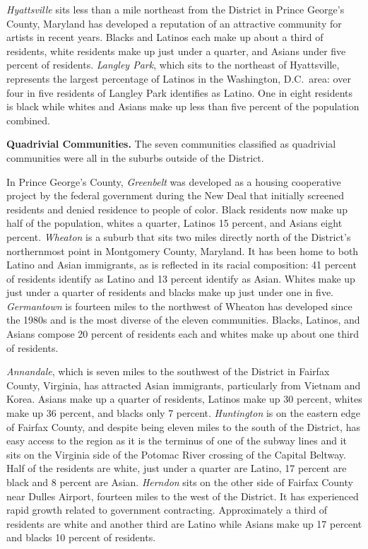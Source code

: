 \documentclass[11pt]{baderart}
\begin{document}
\emph{Hyattsville} sits less than a mile northeast from the District in Prince George's County, Maryland has developed a reputation of an attractive community for artists in recent years. Blacks and Latinos each make up about a third of residents, white residents make up just under a quarter, and Asians under five percent of residents. \emph{Langley Park}, which sits to the northeast of Hyattsville, represents the largest percentage of Latinos in the Washington, D.C.\ area: over four in five residents of Langley Park identifies as Latino. One in eight residents is black while whites and Asians make up less than five percent of the population combined. 

\textbf{Quadrivial Communities.} The seven communities classified as quadrivial communities were all in the suburbs outside of the District. 

In Prince George's County, \emph{Greenbelt} was developed as a housing cooperative project by the federal government during the New Deal that initially screened residents and denied residence to people of color. Black residents now make up half of the population, whites a quarter, Latinos 15 percent, and Asians eight percent. \emph{Wheaton} is a suburb that sits two miles directly north of the District's northernmost point in Montgomery County, Maryland. It has been home to both Latino and Asian immigrants, as is reflected in its racial composition: 41 percent of residents identify as Latino and 13 percent identify as Asian. Whites make up just under a quarter of residents and blacks make up just under one in five. \emph{Germantown} is fourteen miles to the northwest of Wheaton has developed since the 1980s and is the most diverse of the eleven communities. Blacks, Latinos, and Asians compose 20 percent of residents each and whites make up about one third of residents. 

\emph{Annandale}, which is seven miles to the southwest of the District in Fairfax County, Virginia, has attracted Asian immigrants, particularly from Vietnam and Korea. Asians make up a quarter of residents, Latinos make up 30 percent, whites make up 36 percent, and blacks only 7 percent. \emph{Huntington} is on the eastern edge of Fairfax County, and despite being eleven miles to the south of the District, has easy access to the region as it is the terminus of one of the subway lines and it sits on the Virginia side of the Potomac River crossing of the Capital Beltway. Half of the residents are white, just under a quarter are Latino, 17 percent are black and 8 percent are Asian. \emph{Herndon} sits on the other side of Fairfax County near Dulles Airport, fourteen miles to the west of the District. It has experienced rapid growth related to government contracting. Approximately a third of residents are white and another third are Latino while Asians make up 17 percent and blacks 10 percent of residents. 
\end{document}
